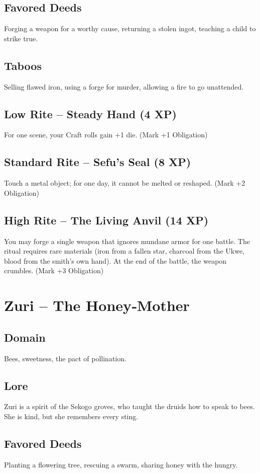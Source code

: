 \documentclass[11pt]{book}
\begin{document}
\subsection*{Favored Deeds}
Forging a weapon for a worthy cause, returning a stolen ingot, teaching a child to strike true.
\subsection*{Taboos}
Selling flawed iron, using a forge for murder, allowing a fire to go unattended.
\subsection*{Low Rite -- Steady Hand (4 XP)}
For one scene, your Craft rolls gain +1 die. (Mark +1 Obligation)
\subsection*{Standard Rite -- Sefu's Seal (8 XP)}
Touch a metal object; for one day, it cannot be melted or reshaped. (Mark +2 Obligation)
\subsection*{High Rite -- The Living Anvil (14 XP)}
You may forge a single weapon that ignores mundane armor for one battle. The ritual requires rare materials (iron from a fallen star, charcoal from the Ukwe, blood from the smith's own hand). At the end of the battle, the weapon crumbles. (Mark +3 Obligation)

\section{Zuri -- The Honey‑Mother}
\subsection*{Domain}
Bees, sweetness, the pact of pollination.
\subsection*{Lore}
Zuri is a spirit of the Sekogo groves, who taught the druids how to speak to bees. She is kind, but she remembers every sting.
\subsection*{Favored Deeds}
Planting a flowering tree, rescuing a swarm, sharing honey with the hungry.
\end{document}

